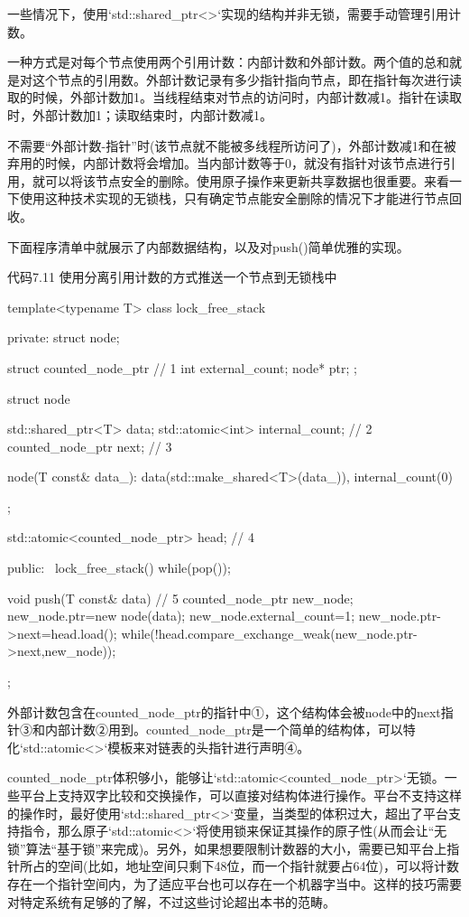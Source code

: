 一些情况下，使用`std::shared\_ptr<>`实现的结构并非无锁，需要手动管理引用计数。

一种方式是对每个节点使用两个引用计数：内部计数和外部计数。两个值的总和就是对这个节点的引用数。外部计数记录有多少指针指向节点，即在指针每次进行读取的时候，外部计数加1。当线程结束对节点的访问时，内部计数减1。指针在读取时，外部计数加1；读取结束时，内部计数减1。

不需要“外部计数-指针”时(该节点就不能被多线程所访问了)，外部计数减1和在被弃用的时候，内部计数将会增加。当内部计数等于0，就没有指针对该节点进行引用，就可以将该节点安全的删除。使用原子操作来更新共享数据也很重要。来看一下使用这种技术实现的无锁栈，只有确定节点能安全删除的情况下才能进行节点回收。

下面程序清单中就展示了内部数据结构，以及对push()简单优雅的实现。

代码7.11 使用分离引用计数的方式推送一个节点到无锁栈中

\begin{cpp}
template<typename T>
class lock_free_stack
{
private:
  struct node;

  struct counted_node_ptr  // 1
  {
    int external_count;
    node* ptr;
  };

  struct node
  {
    std::shared_ptr<T> data;
    std::atomic<int> internal_count;  // 2
    counted_node_ptr next;  // 3

    node(T const& data_):
      data(std::make_shared<T>(data_)),
      internal_count(0)
    {}
  };

  std::atomic<counted_node_ptr> head;  // 4

public:
  ~lock_free_stack()
  {
    while(pop());
  }

  void push(T const& data)  // 5
  {
    counted_node_ptr new_node;
    new_node.ptr=new node(data);
    new_node.external_count=1;
    new_node.ptr->next=head.load();
    while(!head.compare_exchange_weak(new_node.ptr->next,new_node));
  }
};
\end{cpp}

外部计数包含在counted\_node\_ptr的指针中①，这个结构体会被node中的next指针③和内部计数②用到。counted\_node\_ptr是一个简单的结构体，可以特化`std::atomic<>`模板来对链表的头指针进行声明④。

counted\_node\_ptr体积够小，能够让`std::atomic<counted\_node\_ptr>`无锁。一些平台上支持双字比较和交换操作，可以直接对结构体进行操作。平台不支持这样的操作时，最好使用`std::shared\_ptr<>`变量，当类型的体积过大，超出了平台支持指令，那么原子`std::atomic<>`将使用锁来保证其操作的原子性(从而会让“无锁”算法“基于锁”来完成)。另外，如果想要限制计数器的大小，需要已知平台上指针所占的空间(比如，地址空间只剩下48位，而一个指针就要占64位)，可以将计数存在一个指针空间内，为了适应平台也可以存在一个机器字当中。这样的技巧需要对特定系统有足够的了解，不过这些讨论超出本书的范畴。

